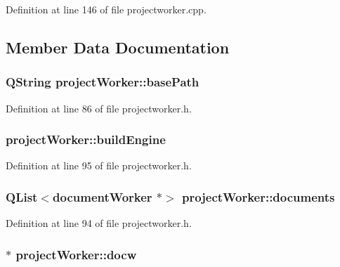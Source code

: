 Definition at line 146 of file projectworker.\+cpp.



\subsection{Member Data Documentation}
\hypertarget{classproject_worker_acebb1a43f3056c7bb74bfe8d6bd0411e}{
\subsubsection[{base\+Path}]{\setlength{\rightskip}{0pt plus 5cm}Q\+String project\+Worker\+::base\+Path\hspace{0.3cm}{\ttfamily [private]}}}\label{classproject_worker_acebb1a43f3056c7bb74bfe8d6bd0411e}


Definition at line 86 of file projectworker.\+h.

\hypertarget{classproject_worker_a88c5f6033c06ee66f102642cfe32497c}{
\subsubsection[{build\+Engine}]{ project\+Worker\+::build\+Engine}}\label{classproject_worker_a88c5f6033c06ee66f102642cfe32497c}


Definition at line 95 of file projectworker.\+h.

\hypertarget{classproject_worker_acdd055f2642057c2766e0aeded1237c5}{
\subsubsection[{documents}]{\setlength{\rightskip}{0pt plus 5cm}Q\+List$<${\bf document\+Worker} $\ast$$>$ project\+Worker\+::documents}}\label{classproject_worker_acdd055f2642057c2766e0aeded1237c5}


Definition at line 94 of file projectworker.\+h.

\hypertarget{classproject_worker_a5bd23894e1f09311b4bebcd92c644e8b}{
\subsubsection[{docw}]{$\ast$ project\+Worker\+::docw\hspace{0.3cm}{\ttfamily [private]}}}\label{classproject_worker_a5bd23894e1f09311b4bebcd92c644e8b}


